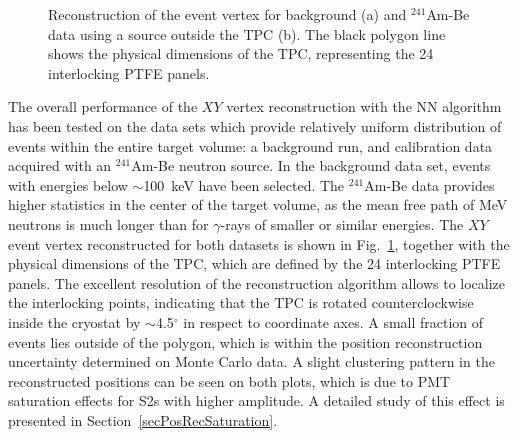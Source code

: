 \begin{figure}[!b]
\centering
{}
\caption[Reconstruction of the event vertex for background and $^{241}$Am-Be data]{Reconstruction of the event vertex for background (a) and $^{241}$Am-Be data using a source outside the TPC (b). The black polygon line shows the physical dimensions of the TPC, representing the 24 interlocking PTFE panels. }
\label{figPosRecAmBeBG}
\end{figure}

The overall performance of the $XY$ vertex reconstruction with the NN algorithm has been tested on the data sets which provide relatively uniform distribution of events within the entire target volume: a background run, and calibration data acquired with an $^{241}$Am-Be neutron source.  In the background data set, events with energies below $\sim$100~keV have been selected. The $^{241}$Am-Be data provides higher statistics in the center of the target volume, as the mean free path of MeV neutrons is much longer than for $\gamma$-rays of smaller or similar energies. 
The $XY$ event vertex reconstructed for both datasets is shown in Fig.~\ref{figPosRecAmBeBG}, together with the physical dimensions of the TPC, which are defined by the 24 interlocking PTFE panels. The excellent resolution of the reconstruction algorithm allows to localize the interlocking points, indicating that the TPC is rotated counterclockwise inside the cryostat by $\sim$4.5$^{\circ}$ in respect to coordinate axes. A small fraction of events lies outside of the polygon, which is within the position reconstruction uncertainty determined on Monte Carlo data. 
A slight clustering pattern in the reconstructed positions can be seen on both plots, which is due to PMT saturation effects for S2s with higher amplitude. A detailed study of this effect is presented in Section~\ref{secPosRecSaturation}.

